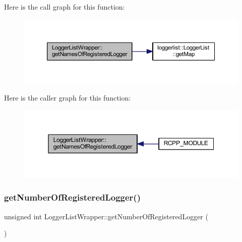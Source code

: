 Here is the call graph for this function\+:\nopagebreak
\begin{figure}[H]
\begin{center}
\leavevmode
\includegraphics[width=350pt]{class_logger_list_wrapper_a0bb53b6ac23b216e4f2f55757c99a458_cgraph}
\end{center}
\end{figure}
Here is the caller graph for this function\+:\nopagebreak
\begin{figure}[H]
\begin{center}
\leavevmode
\includegraphics[width=350pt]{class_logger_list_wrapper_a0bb53b6ac23b216e4f2f55757c99a458_icgraph}
\end{center}
\end{figure}
\mbox{\label{class_logger_list_wrapper_aa95c80ea66ee0237ba97adaaddbb991d}} 
\subsubsection{\texorpdfstring{get\+Number\+Of\+Registered\+Logger()}{getNumberOfRegisteredLogger()}}
{\footnotesize\ttfamily unsigned int Logger\+List\+Wrapper\+::get\+Number\+Of\+Registered\+Logger (\begin{DoxyParamCaption}{ }\end{DoxyParamCaption})\hspace{0.3cm}{\ttfamily [inline]}}

